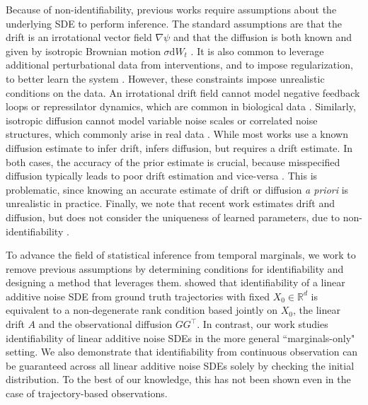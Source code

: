 \documentclass[twoside,11pt]{article}
\newcommand{\R} {\mathbb R}
\begin{document}
Because of non-identifiability, previous works require assumptions about the underlying SDE to perform inference. The standard assumptions are that the drift is an irrotational vector field $\nabla \psi$ \citep{weinreb2018fundamental, lavenant2021towards, vargas2021solving, chizat2022trajectory, terpin2024learning} and that the diffusion is both known and given by isotropic Brownian motion $\sigma \mathrm{d}W_t$ \citep{weinreb2018fundamental, lavenant2021towards, vargas2021solving, chizat2022trajectory, shen2024multi, zhang2024joint, terpin2024learning}. It is also common to leverage additional perturbational data from interventions, and to impose regularization, to better learn the system  \citep{rohbeck2024bicycle, zhang2024joint,maddu2024inferring}. However, these constraints impose unrealistic conditions on the data. An irrotational drift field cannot model negative feedback loops or repressilator dynamics, which are common in biological data \citep{weinreb2018fundamental}. Similarly, isotropic diffusion cannot model variable noise scales or correlated noise structures, which commonly arise in real data \citep{mogensen2022graphical, rohbeck2024bicycle, santos2024learning}. While most works use a known diffusion estimate to infer drift, \citet{forrow2024consistent} infers diffusion, but requires a drift estimate. In both cases, the accuracy of the prior estimate is crucial, because misspecified diffusion typically leads to poor drift estimation and vice-versa \citep{beven1993dispersion,guan2025gradient}. This is problematic, since knowing an accurate estimate of drift or diffusion {\em a priori} is unrealistic in practice. Finally, we note that recent work estimates drift and diffusion, but does not consider the uniqueness of learned parameters, due to non-identifiability \citep{terpin2024learning, brogat2024learning}.

To advance the field of statistical inference from temporal marginals, we work to remove previous assumptions by determining conditions for identifiability and designing a method that leverages them. \citet{wang2024generator} showed that identifiability of a linear additive noise SDE from ground truth trajectories with fixed $X_0 \in \R^d$ is equivalent to a non-degenerate rank condition based jointly on $X_0$, the linear drift $A$ and the observational diffusion $GG^\top$. In contrast, our work studies identifiability of linear additive noise SDEs in the more general ``marginals-only" setting. We also demonstrate that identifiability from continuous observation can be guaranteed across all linear additive noise SDEs solely by checking the initial distribution. To the best of our knowledge, this has not been shown even in the case of trajectory-based observations.
\end{document}
